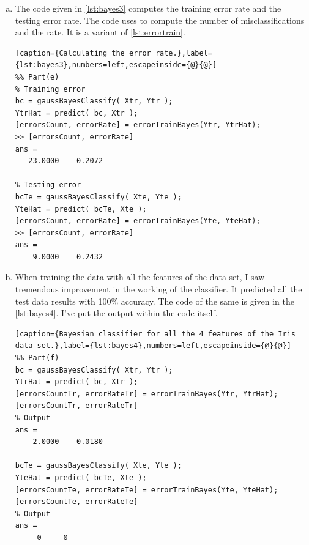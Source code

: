 \documentclass[a4paper, 11pt]{article}
\begin{document}
\begin{enumerate}[(a)]
\item The code given in \autoref{lst:bayes3} computes the training error rate and the testing error rate. The code uses  to compute the number of misclassifications and the rate. It is a variant of \autoref{lst:errortrain}.
\vspace{-20pt}
\begin{lstlisting}[caption={Calculating the error rate.},label={lst:bayes3},numbers=left,escapeinside={@}{@}]
%% Part(e)
% Training error
bc = gaussBayesClassify( Xtr, Ytr );
YtrHat = predict( bc, Xtr );
[errorsCount, errorRate] = errorTrainBayes(Ytr, YtrHat);
>> [errorsCount, errorRate]
ans =
   23.0000    0.2072

% Testing error
bcTe = gaussBayesClassify( Xte, Yte );
YteHat = predict( bcTe, Xte );
[errorsCount, errorRate] = errorTrainBayes(Yte, YteHat);
>> [errorsCount, errorRate]
ans =
    9.0000    0.2432
\end{lstlisting}

\item When training the data with all the features of the data set, I saw tremendous improvement in the working of the classifier. It predicted all the test data results with 100\% accuracy. The code of the same is given in the \autoref{lst:bayes4}. I've put the output within the code itself.
\vspace{-20pt}
\begin{lstlisting}[caption={Bayesian classifier for all the 4 features of the Iris data set.},label={lst:bayes4},numbers=left,escapeinside={@}{@}]
%% Part(f)
bc = gaussBayesClassify( Xtr, Ytr );
YtrHat = predict( bc, Xtr );
[errorsCountTr, errorRateTr] = errorTrainBayes(Ytr, YtrHat);
[errorsCountTr, errorRateTr]
% Output
ans =
    2.0000    0.0180
    
bcTe = gaussBayesClassify( Xte, Yte );
YteHat = predict( bcTe, Xte );
[errorsCountTe, errorRateTe] = errorTrainBayes(Yte, YteHat);
[errorsCountTe, errorRateTe]
% Output
ans =
     0     0
\end{lstlisting}
\end{enumerate}
\end{document}
